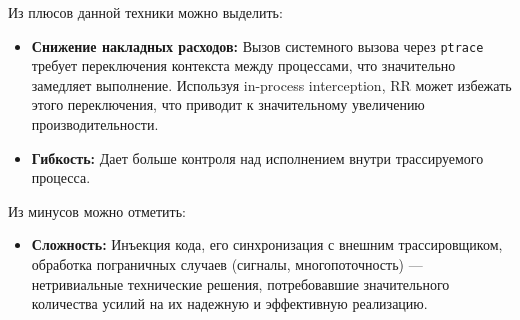 Из плюсов данной техники можно выделить:
\begin{itemize}

  \item \textbf{Снижение накладных расходов: } Вызов системного вызова через
  \texttt{ptrace} требует переключения контекста между процессами, что
  значительно замедляет выполнение. Используя in-process interception, RR может
  избежать этого переключения, что приводит к значительному увеличению
  производительности.

  \item \textbf{Гибкость: } Дает больше контроля над исполнением внутри
  трассируемого процесса.

\end{itemize}

Из минусов можно отметить:

\begin{itemize}

  \item \textbf{Сложность: } Инъекция кода, его синхронизация с внешним
  трассировщиком, обработка пограничных случаев (сигналы, многопоточность) ---
  нетривиальные технические решения, потребовавшие значительного количества
  усилий на их надежную и эффективную реализацию.

\end{itemize}






